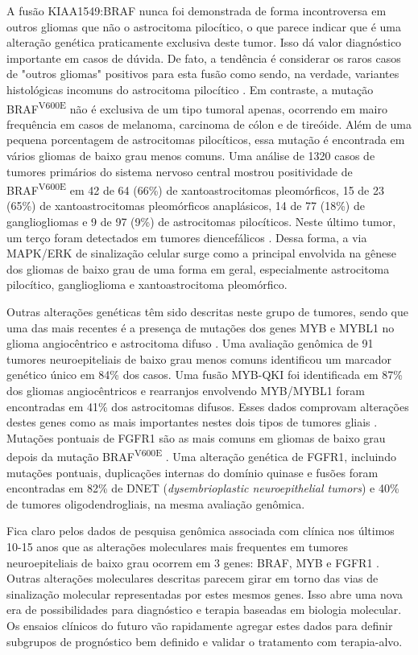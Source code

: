 \documentclass[11pt,a4paper,oldfontcommands]{memoir}
\begin{document}
A fusão KIAA1549:BRAF nunca foi demonstrada de forma incontroversa em outros gliomas que não o astrocitoma pilocítico, o que parece indicar que é uma alteração genética praticamente exclusiva deste tumor. Isso dá valor diagnóstico importante em casos de dúvida. De fato, a tendência é considerar os raros casos de "outros gliomas" positivos para esta fusão como sendo, na verdade, variantes histológicas incomuns do astrocitoma pilocítico \cite{Jones2012}. Em contraste, a mutação BRAF\textsuperscript{V600E} não é exclusiva de um tipo tumoral apenas, ocorrendo em mairo frequência em casos de melanoma, carcinoma de cólon e de tireóide. Além de uma pequena porcentagem de astrocitomas pilocíticos, essa mutação é encontrada em vários gliomas de baixo grau menos comuns. Uma análise de 1320 casos de tumores primários do sistema nervoso central mostrou positividade de BRAF\textsuperscript{V600E} em 42 de 64 (66\%) de xantoastrocitomas pleomórficos, 15 de 23 (65\%) de xantoastrocitomas pleomórficos anaplásicos, 14 de 77 (18\%) de gangliogliomas e 9 de 97 (9\%) de astrocitomas pilocíticos. Neste último tumor, um terço foram detectados em tumores diencefálicos \cite{Schindler2011}. Dessa forma, a via MAPK/ERK de sinalização celular surge como a principal envolvida na gênese dos gliomas de baixo grau de uma forma em geral, especialmente astrocitoma pilocítico, ganglioglioma e xantoastrocitoma pleomórfico.

Outras alterações genéticas têm sido descritas neste grupo de tumores, sendo que uma das mais recentes é a presença de mutações dos genes MYB e MYBL1 no glioma angiocêntrico e astrocitoma difuso \cite{Tatevossian2010}. Uma avaliação genômica de 91 tumores neuroepiteliais de baixo grau menos comuns identificou um marcador genético único em 84\% dos casos. Uma fusão MYB-QKI foi identificada em 87\% dos gliomas angiocêntricos e rearranjos envolvendo MYB/MYBL1 foram encontradas em 41\% dos astrocitomas difusos. Esses dados comprovam alterações destes genes como as mais importantes nestes dois tipos de tumores gliais \cite{Qaddoumi2016}. Mutações pontuais de FGFR1 são as mais comuns em gliomas de baixo grau depois da mutação BRAF\textsuperscript{V600E} \cite{now209}. Uma alteração genética de FGFR1, incluindo mutações pontuais, duplicações internas do domínio quinase e fusões foram encontradas em 82\% de DNET (\textit{dysembrioplastic neuroepithelial tumors}) e 40\% de tumores oligodendrogliais, na mesma avaliação genômica.

Fica claro pelos dados de pesquisa genômica associada com clínica nos últimos 10-15 anos que as alterações moleculares mais frequentes em tumores neuroepiteliais de baixo grau ocorrem em 3 genes: BRAF, MYB e FGFR1 \cite{now209,Qaddoumi2016}. Outras alterações moleculares descritas parecem girar em torno das vias de sinalização molecular representadas por estes mesmos genes. Isso abre uma nova era de possibilidades para diagnóstico e terapia baseadas em biologia molecular. Os ensaios clínicos do futuro vão rapidamente agregar estes dados para definir subgrupos de prognóstico bem definido e validar o tratamento com terapia-alvo.
\end{document}
